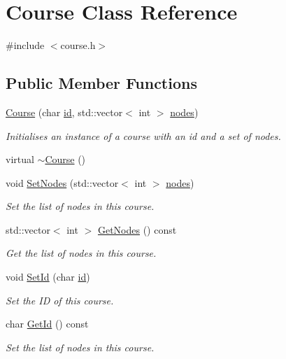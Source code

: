 \hypertarget{classCourse}{\section{\-Course \-Class \-Reference}
\label{classCourse}
}


{\ttfamily \#include $<$course.\-h$>$}

\subsection*{\-Public \-Member \-Functions}
\begin{DoxyCompactItemize}
\item 
\hyperlink{classCourse_a2151dd20a9c4805efd35725ffa718650}{\-Course} (char \hyperlink{classCourse_ae0d417ad4feae0725245ed6a15e8ea57}{id}, std\-::vector$<$ int $>$ \hyperlink{classCourse_a4632a36a3759d00c6da824eafe8a50b2}{nodes})
\begin{DoxyCompactList}\small\item\em \-Initialises an instance of a course with an id and a set of nodes. \end{DoxyCompactList}\item 
virtual \hyperlink{classCourse_aa9038f2e129526920037dda9e76d69d0}{$\sim$\-Course} ()
\item 
void \hyperlink{classCourse_adf3085828bb525ab154269ccec3e92a0}{\-Set\-Nodes} (std\-::vector$<$ int $>$ \hyperlink{classCourse_a4632a36a3759d00c6da824eafe8a50b2}{nodes})
\begin{DoxyCompactList}\small\item\em \-Set the list of nodes in this course. \end{DoxyCompactList}\item 
std\-::vector$<$ int $>$ \hyperlink{classCourse_a8524edc4e1554b8d9ee5e5e9151d7c77}{\-Get\-Nodes} () const 
\begin{DoxyCompactList}\small\item\em \-Get the list of nodes in this course. \end{DoxyCompactList}\item 
void \hyperlink{classCourse_a6efc0783dafcc936338e7ffc365e1323}{\-Set\-Id} (char \hyperlink{classCourse_ae0d417ad4feae0725245ed6a15e8ea57}{id})
\begin{DoxyCompactList}\small\item\em \-Set the \-I\-D of this course. \end{DoxyCompactList}\item 
char \hyperlink{classCourse_a129280d0579695c0de99496b69be9308}{\-Get\-Id} () const 
\begin{DoxyCompactList}\small\item\em \-Set the list of nodes in this course. \end{DoxyCompactList}\end{DoxyCompactItemize}
